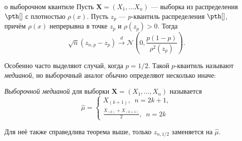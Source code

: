 \begin{theorem}[label=quantile]{о выборочном квантиле}{}
    Пусть $\mathbf X = (X_1,\ldots X_n)$ --- выборка из распределения $\pth[]$ с плотностью $\rho(x)$. Пусть $z_p$ --- $p$-квантиль распределения $\pth[]$, причём $\rho(x)$ непрерывна в точке $z_p$ и $\rho(z_p) > 0$. Тогда
    \[
    \sqrt{n}(z_{n, p} - z_p) \stackrel{d}{\to} \mathcal{N}\left(0, \frac{p(1-p)}{\rho^2(z_p)}\right).
    \]
\end{theorem}

Особенно часто выделяют случай, когда $p=1/2$. Такой $p$-квантиль называют \textit{медианой}, но выборочный аналог обычно определяют несколько иначе:
\begin{definition}
    \textit{Выборочной медианой} для выборки $\mathbf X = (X_1, \ldots, X_n)$ называется
    \[
    \widehat{\mu} = \left\{
    \begin{aligned}
    X_{(k+1)},\,\,\,n = 2k+1,\\
    \frac{X_{(k)}+X_{(k+1)}}{2},\,\,\, n = 2k
    \end{aligned}
    \right.
    \]
\end{definition}

Для неё также справедлива теорема выше, только $z_{n, 1/2}$ заменяется на $\widehat{\mu}$.

